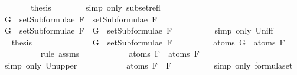 \begin{isabellebody}
\ \ \ \ \isamarkupfalse%
\ \isamarkupfalse%
\ {\isacharquery}thesis\isanewline
\ \ \ \ \ \ \isamarkupfalse%
\ {\isacharparenleft}simp\ only{\isacharcolon}\ subset{\isacharunderscore}refl{\isacharparenright}\isanewline
\ \ \isamarkupfalse%
\isanewline
\ \ \ \ \isamarkupfalse%
\ {\isachardoublequoteopen}G\ {\isasymin}\ setSubformulae\ F{}\ {\isasymunion}\ setSubformulae\ F{}{\isachardoublequoteclose}\isanewline
\ \ \ \ \isamarkupfalse%
\ \isamarkupfalse%
\ {\isachardoublequoteopen}G\ {\isasymin}\ setSubformulae\ F{}\ {\isasymor}\ G\ {\isasymin}\ setSubformulae\ F{}{\isachardoublequoteclose}\ \ \isanewline
\ \ \ \ \ \ \isamarkupfalse%
\ {\isacharparenleft}simp\ only{\isacharcolon}\ Un{\isacharunderscore}iff{\isacharparenright}\isanewline
\ \ \ \ \isamarkupfalse%
\ \isamarkupfalse%
\ {\isacharquery}thesis\isanewline
\ \ \ \ \isamarkupfalse%
\ \isanewline
\ \ \ \ \ \ \isamarkupfalse%
\ {\isachardoublequoteopen}G\ {\isasymin}\ setSubformulae\ F{}{\isachardoublequoteclose}\isanewline
\ \ \ \ \ \ \isamarkupfalse%
\ \isamarkupfalse%
\ {\isachardoublequoteopen}atoms\ G\ {\isasymsubseteq}\ atoms\ F{}{\isachardoublequoteclose}\isanewline
\ \ \ \ \ \ \ \ \isamarkupfalse%
\ {\isacharparenleft}rule\ assms{\isacharparenleft}{}{\isacharparenright}{\isacharparenright}\isanewline
\ \ \ \ \ \ \isamarkupfalse%
\ \isamarkupfalse%
\ {\isachardoublequoteopen}{\isasymdots}\ {\isasymsubseteq}\ atoms\ F{}\ {\isasymunion}\ atoms\ F{}{\isachardoublequoteclose}\isanewline
\ \ \ \ \ \ \ \ \isamarkupfalse%
\ {\isacharparenleft}simp\ only{\isacharcolon}\ Un{\isacharunderscore}upper{}{\isacharparenright}\isanewline
\ \ \ \ \ \ \isamarkupfalse%
\ \isamarkupfalse%
\ {\isachardoublequoteopen}{\isasymdots}\ {\isacharequal}\ atoms\ {\isacharparenleft}F{}\ \isactrlbold {\isasymor}\ F{}{\isacharparenright}{\isachardoublequoteclose}\isanewline
\ \ \ \ \ \ \ \ \isamarkupfalse%
\ {\isacharparenleft}simp\ only{\isacharcolon}\ formula{\isachardot}set{\isacharparenleft}{}{\isacharparenright}{\isacharparenright}\isanewline
\ \ \ \ \ \ \isamarkupfalse%
\ \isamarkupfalse%

\end{isabellebody}
